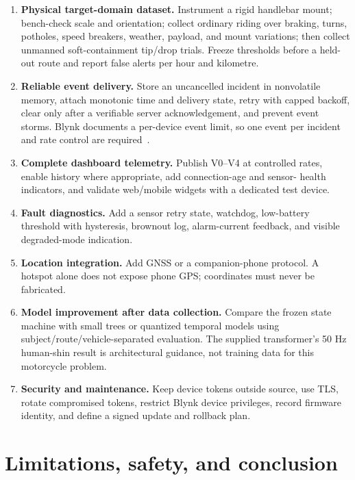 \documentclass[12pt,a4paper]{article}
\begin{document}
\begin{enumerate}
  \item \textbf{Physical target-domain dataset.} Instrument a rigid handlebar
        mount; bench-check scale and orientation; collect ordinary riding over
        braking, turns, potholes, speed breakers, weather, payload, and mount
        variations; then collect unmanned soft-containment tip/drop trials.
        Freeze thresholds before a held-out route and report false alerts per
        hour and kilometre.
  \item \textbf{Reliable event delivery.} Store an uncancelled incident in
        nonvolatile memory, attach monotonic time and delivery state, retry with
        capped backoff, clear only after a verifiable server acknowledgement,
        and prevent event storms. Blynk documents a per-device event limit, so
        one event per incident and rate control are required~\cite{blynkevents}.
  \item \textbf{Complete dashboard telemetry.} Publish V0--V4 at controlled
        rates, enable history where appropriate, add connection-age and sensor-
        health indicators, and validate web/mobile widgets with a dedicated
        test device.
  \item \textbf{Fault diagnostics.} Add a sensor retry state, watchdog,
        low-battery threshold with hysteresis, brownout log, alarm-current
        feedback, and visible degraded-mode indication.
  \item \textbf{Location integration.} Add GNSS or a companion-phone protocol.
        A hotspot alone does not expose phone GPS; coordinates must never be
        fabricated.
  \item \textbf{Model improvement after data collection.} Compare the frozen
        state machine with small trees or quantized temporal models using
        subject/route/vehicle-separated evaluation. The supplied transformer's
        50 Hz human-shin result is architectural guidance, not training data
        for this motorcycle problem.
  \item \textbf{Security and maintenance.} Keep device tokens outside source,
        use TLS, rotate compromised tokens, restrict Blynk device privileges,
        record firmware identity, and define a signed update and rollback plan.
\end{enumerate}

\section{Limitations, safety, and conclusion}
\end{document}
